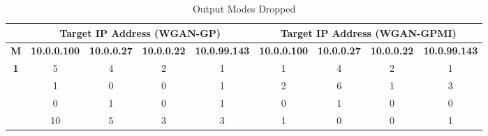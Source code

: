 \begin{table}[!htbp]
	\centering
	\caption{Output Modes Dropped}
	\label{tab:output_modes}
	\begin{adjustbox}{angle=90}
		\begin{tabular}{ccccccccc}
			\multicolumn{1}{c|}{} & \multicolumn{4}{c|}{\textbf{Target IP Address (WGAN-GP)}} & \multicolumn{4}{c}{\textbf{Target IP Address (WGAN-GPMI)}} \\ \hline
			\multicolumn{1}{c|}{\textbf{M}} & \multicolumn{1}{l|}{\textbf{10.0.0.100}} & \multicolumn{1}{l|}{\textbf{10.0.0.27}} & \multicolumn{1}{l|}{\textbf{10.0.0.22}} & \multicolumn{1}{l|}{\textbf{10.0.99.143}} & \multicolumn{1}{l|}{\textbf{10.0.0.100}} & \multicolumn{1}{l|}{\textbf{10.0.0.27}} & \multicolumn{1}{l|}{\textbf{10.0.0.22}} & \multicolumn{1}{l}{\textbf{10.0.99.143}} \\ \hline
			\multicolumn{1}{c|}{\multirow{4}{*}{\textbf{1}}} & \multicolumn{1}{c|}{5} & \multicolumn{1}{c|}{4} & \multicolumn{1}{c|}{2} & \multicolumn{1}{c|}{1} & \multicolumn{1}{c|}{1} & \multicolumn{1}{c|}{4} & \multicolumn{1}{c|}{2} & 1 \\
			\multicolumn{1}{c|}{} & \multicolumn{1}{c|}{1} & \multicolumn{1}{c|}{0} & \multicolumn{1}{c|}{0} & \multicolumn{1}{c|}{1} & \multicolumn{1}{c|}{2} & \multicolumn{1}{c|}{6} & \multicolumn{1}{c|}{1} & 3 \\
			\multicolumn{1}{c|}{} & \multicolumn{1}{c|}{0} & \multicolumn{1}{c|}{1} & \multicolumn{1}{c|}{0} & \multicolumn{1}{c|}{1} & \multicolumn{1}{c|}{0} & \multicolumn{1}{c|}{1} & \multicolumn{1}{c|}{0} & 0 \\
			\multicolumn{1}{c|}{} & \multicolumn{1}{c|}{10} & \multicolumn{1}{c|}{5} & \multicolumn{1}{c|}{3} & \multicolumn{1}{c|}{3} & \multicolumn{1}{c|}{1} & \multicolumn{1}{c|}{0} & \multicolumn{1}{c|}{0} & 1 \\ \hline
			

\end{tabular}
\end{adjustbox}
\end{table}
